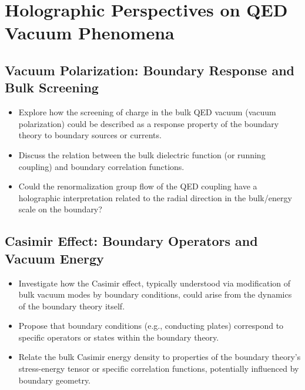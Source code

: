 \documentclass{amsart}
\begin{document}
\section{Holographic Perspectives on QED Vacuum Phenomena}

\subsection{Vacuum Polarization: Boundary Response and Bulk Screening}
\begin{itemize}
    \item Explore how the screening of charge in the bulk QED vacuum (vacuum polarization) could be described as a response property of the boundary theory to boundary sources or currents.
    \item Discuss the relation between the bulk dielectric function (or running coupling) and boundary correlation functions.
    \item Could the renormalization group flow of the QED coupling have a holographic interpretation related to the radial direction in the bulk/energy scale on the boundary?
\end{itemize}

\subsection{Casimir Effect: Boundary Operators and Vacuum Energy}
\begin{itemize}
    \item Investigate how the Casimir effect, typically understood via modification of bulk vacuum modes by boundary conditions, could arise from the dynamics of the boundary theory itself.
    \item Propose that boundary conditions (e.g., conducting plates) correspond to specific operators or states within the boundary theory.
    \item Relate the bulk Casimir energy density to properties of the boundary theory's stress-energy tensor or specific correlation functions, potentially influenced by boundary geometry.
\end{itemize}
\end{document}
